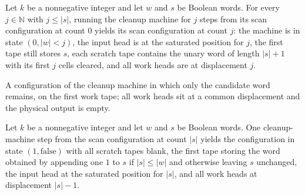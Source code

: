 \begin{lemma}
\label{Turing.FinTM.splitRestore_scan}
\leanok
{}
Let $k$ be a nonnegative integer and let $w$ and $s$ be Boolean words. For every
$j\in\mathbb N$ with $j\le |s|$, running the cleanup machine for $j$ steps from its scan
configuration at count $0$ yields its scan configuration at count $j$: the machine is in
state $(0,|w|<j)$, the input head is at the saturated position for $j$, the first tape
still stores $s$, each scratch tape contains the unary word of length $|s|+1$ with its
first $j$ cells cleared, and all work heads are at displacement $j$.
\end{lemma}

\begin{definition}
\label{Turing.FinTM.splitRestoreClean}
\leanok
{}
A configuration of the cleanup machine in which only the candidate word
remains, on the first work tape; all work heads sit at a common displacement
and the physical output is empty.
\end{definition}

\begin{lemma}
\label{Turing.FinTM.splitRestore_append}
\leanok
{}
Let $k$ be a nonnegative integer and let $w$ and $s$ be Boolean words. One
cleanup-machine step from the scan configuration at count $|s|$ yields the configuration
in state $(1,\mathrm{false})$ with all scratch tapes blank, the first tape storing the
word obtained by appending one $1$ to $s$ if $|s|\le |w|$ and otherwise leaving $s$
unchanged, the input head at the saturated position for $|s|$, and all work heads at
displacement $|s|-1$.
\end{lemma}

